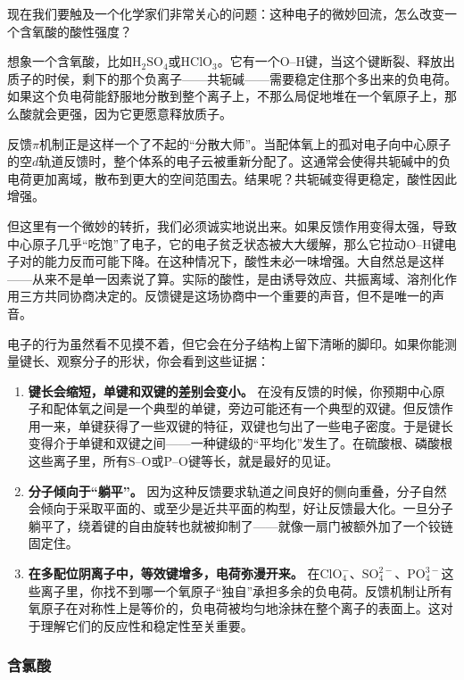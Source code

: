 \documentclass[UTF8]{ctexbook}
\begin{document}
现在我们要触及一个化学家们非常关心的问题：这种电子的微妙回流，怎么改变一个含氧酸的酸性强度？

想象一个含氧酸，比如$\mathrm{H_2SO_4}$或$\mathrm{HClO_3}$。它有一个$\mathrm{O}$--$\mathrm{H}$键，当这个键断裂、释放出质子的时侯，剩下的那个负离子——共轭碱——需要稳定住那个多出来的负电荷。如果这个负电荷能舒服地分散到整个离子上，不那么局促地堆在一个氧原子上，那么酸就会更强，因为它更愿意释放质子。

反馈$\pi$机制正是这样一个了不起的“分散大师”。当配体氧上的孤对电子向中心原子的空$d$轨道反馈时，整个体系的电子云被重新分配了。这通常会使得共轭碱中的负电荷更加离域，散布到更大的空间范围去。结果呢？共轭碱变得更稳定，酸性因此增强。

但这里有一个微妙的转折，我们必须诚实地说出来。如果反馈作用变得太强，导致中心原子几乎“吃饱”了电子，它的电子贫乏状态被大大缓解，那么它拉动$\mathrm{O}$--$\mathrm{H}$键电子对的能力反而可能下降。在这种情况下，酸性未必一味增强。大自然总是这样——从来不是单一因素说了算。实际的酸性，是由诱导效应、共振离域、溶剂化作用三方共同协商决定的。反馈键是这场协商中一个重要的声音，但不是唯一的声音。


电子的行为虽然看不见摸不着，但它会在分子结构上留下清晰的脚印。如果你能测量键长、观察分子的形状，你会看到这些证据：

\begin{enumerate}
  \item \textbf{键长会缩短，单键和双键的差别会变小。} 在没有反馈的时候，你预期中心原子和配体氧之间是一个典型的单键，旁边可能还有一个典型的双键。但反馈作用一来，单键获得了一些双键的特征，双键也匀出了一些电子密度。于是键长变得介于单键和双键之间——一种键级的“平均化”发生了。在硫酸根、磷酸根这些离子里，所有$\mathrm{S}$--$\mathrm{O}$或$\mathrm{P}$--$\mathrm{O}$键等长，就是最好的见证。
  
  \item \textbf{分子倾向于“躺平”。} 因为这种反馈要求轨道之间良好的侧向重叠，分子自然会倾向于采取平面的、或至少是近共平面的构型，好让反馈最大化。一旦分子躺平了，绕着键的自由旋转也就被抑制了——就像一扇门被额外加了一个铰链固定住。
  
  \item \textbf{在多配位阴离子中，等效键增多，电荷弥漫开来。} 在$\mathrm{ClO_4^-}$、$\mathrm{SO_4^{2-}}$、$\mathrm{PO_4^{3-}}$这些离子里，你找不到哪一个氧原子“独自”承担多余的负电荷。反馈机制让所有氧原子在对称性上是等价的，负电荷被均匀地涂抹在整个离子的表面上。这对于理解它们的反应性和稳定性至关重要。
\end{enumerate}

\subsubsection{含氯酸}
\end{document}
